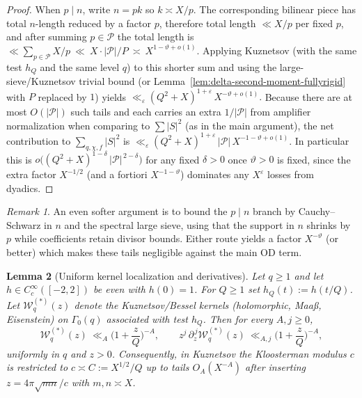 \documentclass[11pt]{article}
\newtheorem{lemma}{Lemma}[part]
\theoremstyle{definition}
\theoremstyle{remark}
\newtheorem{remark}[lemma]{Remark}
\numberwithin{equation}{part}
\begin{document}
\begin{proof}
	When $p\mid n$, write $n=pk$ so $k\asymp X/p$. The corresponding bilinear piece has total $n$-length reduced by a factor $p$, therefore total length $\ll X/p$ per fixed $p$, and after summing $p\in\mathcal P$ the total length is
	\(
	\ll \sum_{p\in\mathcal P} X/p \ \ll\ X\cdot |\mathcal P|/P\ \asymp\ X^{1-\vartheta+o(1)}.
	\)
	Applying Kuznetsov (with the same test $h_Q$ and the same level $q$) to this shorter sum and using the large-sieve/Kuznetsov trivial bound (or Lemma~\ref{lem:delta-second-moment-fullyrigid} with $P$ replaced by $1$) yields
	\(
	\ll_\varepsilon (Q^2+X)^{1+\varepsilon}\,X^{-\vartheta+o(1)}.
	\)
	Because there are at most $O(|\mathcal P|)$ such tails and each carries an extra $1/|\mathcal P|$ from amplifier normalization when comparing to $\sum|S|^2$ (as in the main argument), the net contribution to $\sum_{q,\chi,f}|S|^2$ is
	\(
	\ll_\varepsilon (Q^2+X)^{1+\varepsilon}\,|\mathcal P|\,X^{-1-\vartheta+o(1)}.
	\)
	In particular this is $o\!\big((Q^2+X)^{1-\delta}\,|\mathcal P|^{\,2-\delta}\big)$ for any fixed $\delta>0$ once $\vartheta>0$ is fixed, since the extra factor $X^{-1/2}$ (and a fortiori $X^{-1-\vartheta}$) dominates any $X^{\varepsilon}$ losses from dyadics.
\end{proof}

\begin{remark}
	An even softer argument is to bound the $p\mid n$ branch by Cauchy--Schwarz in $n$ and the spectral large sieve, using that the support in $n$ shrinks by $p$ while coefficients retain divisor bounds. Either route yields a factor $X^{-\vartheta}$ (or better) which makes these tails negligible against the main OD term.
\end{remark}


\begin{lemma}[Uniform kernel localization and derivatives]\label{lem:kernel-localization}
	Let $q\ge 1$ and let $h\in C_c^\infty([-2,2])$ be even with $h(0)=1$. For $Q\ge 1$ set $h_Q(t):=h(t/Q)$. Let $\mathcal W_q^{(*)}(z)$ denote the Kuznetsov/Bessel kernels (holomorphic, Maaß, Eisenstein) on $\Gamma_0(q)$ associated with test $h_Q$. Then for every $A,j\ge 0$,
	\[
		\mathcal W_q^{(*)}(z)\ \ll_A \Big(1+\frac{z}{Q}\Big)^{-A},\qquad
		z^j\,\partial_z^{\,j}\mathcal W_q^{(*)}(z)\ \ll_{A,j}\Big(1+\frac{z}{Q}\Big)^{-A},
	\]
	uniformly in $q$ and $z>0$. Consequently, in Kuznetsov the Kloosterman modulus $c$ is restricted to $c\asymp C:=X^{1/2}/Q$ up to tails $O_A(X^{-A})$ after inserting $z=4\pi\sqrt{mn}/c$ with $m,n\asymp X$.
\end{lemma}
\end{document}
